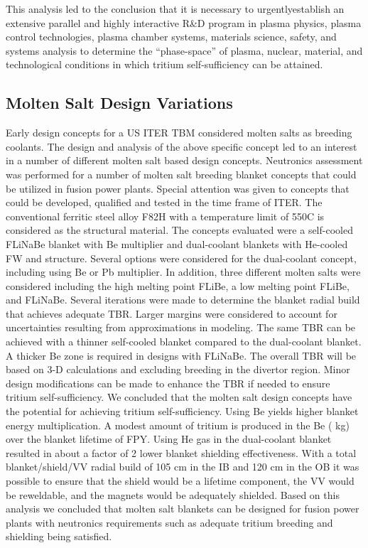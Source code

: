 This analysis led to the conclusion that it is necessary to urgentlyestablish
an extensive parallel and highly interactive R\&D program in plasma physics,
plasma control technologies, plasma chamber systems, materials science,
safety, and systems analysis to determine the “phase-space” of plasma,
nuclear, material, and technological conditions in which tritium
self-sufficiency can be attained.


\subsection{Molten Salt Design Variations}

Early design concepts for a US ITER \gls{TBM} considered molten salts as
breeding coolants.  The design and analysis of the above specific concept led
to an interest in a number of different molten salt based design concepts.
Neutronics assessment was performed for a number of molten salt breeding
blanket concepts that could be utilized in fusion power plants. Special
attention was given to concepts that could be developed, qualified and tested
in the time frame of ITER. The conventional ferritic steel alloy F82H with a
temperature limit of 550\textdegree C is considered as the structural material. The
concepts evaluated were a self-cooled FLiNaBe blanket with Be multiplier and
dual-coolant blankets with He-cooled FW and structure.  Several options were
considered for the dual-coolant concept, including using Be or Pb
multiplier. In addition, three different molten salts were considered
including the high melting point FLiBe, a low melting point FLiBe, and
FLiNaBe. Several iterations were made to determine the blanket radial build
that achieves adequate \gls{TBR}. Larger margins were considered to account
for uncertainties resulting from approximations in modeling.  The same
\gls{TBR} can be achieved with a thinner self-cooled blanket compared to the
dual-coolant blanket. A thicker Be zone is required in designs with
FLiNaBe. The overall \gls{TBR} will be  based on 3-D
calculations and excluding breeding in the divertor region. Minor design
modifications can be made to enhance the \gls{TBR} if needed to ensure tritium
self-sufficiency. We concluded that the molten salt design concepts have the
potential for achieving tritium self-sufficiency. Using Be yields higher
blanket energy multiplication. A modest amount of tritium is produced in the
Be ( kg) over the blanket lifetime of  FPY. Using He
gas in the dual-coolant blanket resulted in about a factor of 2 lower blanket
shielding effectiveness. With a total blanket/shield/\gls{VV} radial build of
105 cm in the \gls{IB} and 120 cm in the \gls{OB} it was possible to ensure
that the shield would be a lifetime component, the \gls{VV} would be
reweldable, and the magnets would be adequately shielded. Based on this
analysis we concluded that molten salt blankets can be designed for fusion
power plants with neutronics requirements such as adequate tritium breeding
and shielding being satisfied.

